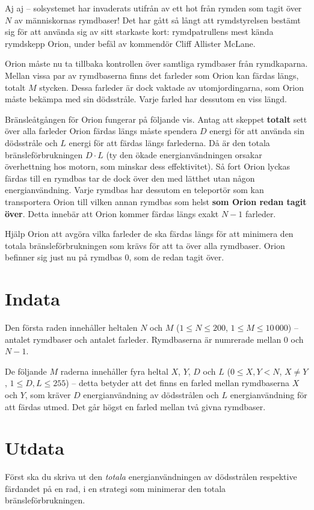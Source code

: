 Aj aj -- solsystemet har invaderats utifrån av ett hot från rymden som tagit över $N$ av människornas rymdbaser!
Det har gått så långt att rymdstyrelsen bestämt sig för att använda sig av sitt starkaste kort: rymdpatrullens mest kända rymdskepp Orion, under befäl av kommendör Cliff Allister McLane.

Orion måste nu ta tillbaka kontrollen över samtliga rymdbaser från rymdkaparna.
Mellan vissa par av rymdbaserna finns det farleder som Orion kan färdas längs, totalt $M$ stycken.
Dessa farleder är dock vaktade av utomjordingarna, som Orion måste bekämpa med sin dödsstråle.
Varje farled har dessutom en viss längd.

Bränsleåtgången för Orion fungerar på följande vis.
Antag att skeppet \textbf{totalt} sett över alla farleder Orion färdas längs måste spendera $D$ energi för att använda sin dödsstråle och $L$ energi för att färdas längs farlederna.
Då är den totala bränsleförbrukningen $D \cdot L$ (ty den ökade energianvändningen orsakar överhettning hos motorn, som minskar dess effektivitet).
Så fort Orion lyckas färdas till en rymdbas tar de dock över den med lätthet utan någon energianvändning.
Varje rymdbas har dessutom en teleportör som kan transportera Orion till vilken annan rymdbas som helst \textbf{som Orion redan tagit över}.
Detta innebär att Orion kommer färdas längs exakt $N - 1$ farleder.

Hjälp Orion att avgöra vilka farleder de ska färdas längs för att minimera den totala bränsleförbrukningen som krävs för att ta över alla rymdbaser. 
Orion befinner sig just nu på rymdbas $0$, som de redan tagit över.

\section*{Indata}
Den första raden innehåller heltalen $N$ och $M$ ($1 \le N \le 200$, $1 \le M \le 10\,000$) --
antalet rymdbaser och antalet farleder.
Rymdbaserna är numrerade mellan $0$ och $N - 1$.

De följande $M$ raderna innehåller fyra heltal $X$, $Y$, $D$ och $L$ ($0 \le X, Y < N$, $X \neq Y$, $1 \le D, L \le 255$) --
detta betyder att det finns en farled mellan rymdbaserna $X$ och $Y$, som kräver $D$ energianvändning av dödsstrålen och $L$ energianvändning för att färdas utmed.
Det går högst en farled mellan två givna rymdbaser.

\section*{Utdata}
Först ska du skriva ut den \emph{totala} energianvändningen av dödsstrålen respektive färdandet på en rad, i en strategi som minimerar den totala bränsleförbrukningen.

